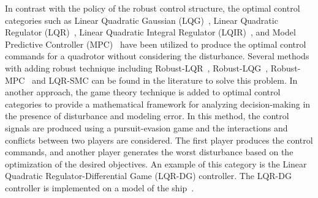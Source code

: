 \documentclass[3p]{elsarticle}
\begin{document}
In contrast with the policy of the robust control structure, the optimal control categories such as Linear Quadratic Gaussian (LQG)~\cite{7367782}, Linear Quadratic Regulator (LQR)~\cite{7064553_LQR}, Linear Quadratic Integral Regulator (LQIR)~\cite{article_LQIR}, and Model Predictive Controller (MPC)~\cite{SANTOS2022123, CAMARA20231} have been utilized to produce the optimal control commands for a quadrotor without considering the disturbance. Several methods with adding robust technique including Robust-LQR~\cite{robust_LQR}, Robust-LQG~\cite{XU202084}, Robust-MPC~\cite{YAN202335} and LQR-SMC can be found in the literature to solve this problem. In another approach, the game theory technique is added to optimal control categories to provide a mathematical framework for analyzing decision-making in the presence of disturbance and modeling error. In this method, the control signals are produced using a pursuit-evasion game and the interactions and conflicts between two players are considered. The first player produces the control commands, and another player generates the worst disturbance based on the optimization of the desired objectives. An example of this category is the Linear Quadratic Regulator-Differential Game (LQR-DG) controller. The LQR-DG controller is implemented on a model of the ship~\cite{6957349}.



















































\end{document}
